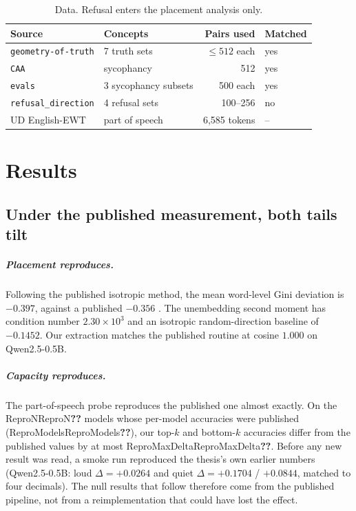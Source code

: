 \documentclass[11pt]{report}
\newcommand{\num}[1]{\ifcsname #1\endcsname\csname #1\endcsname\else\textbf{??}\fi}
\begin{document}
\begin{table}[h]\centering\small
\begin{tabular}{llrl}\toprule
Source & Concepts & Pairs used & Matched\\\midrule
\texttt{geometry-of-truth} \citep{marks2024geometry} & 7 truth sets & $\le 512$ each & yes\\
\texttt{CAA} \citep{panickssery2024steering} & sycophancy & 512 & yes\\
\texttt{evals} \citep{perez2022discovering} & 3 sycophancy subsets & 500 each & yes\\
\texttt{refusal\_direction} \citep{arditi2024refusal} & 4 refusal sets & 100--256 & no\\
UD English-EWT & part of speech & 6{,}585 tokens & --\\\bottomrule
\end{tabular}
\caption{Data. Refusal enters the placement analysis only.}
\end{table}

\chapter{Results}\label{ch:results}

\section{Under the published measurement, both tails tilt}\label{sec:tilt}
\paragraph{Placement reproduces.} Following the published isotropic method, the
mean word-level Gini deviation is $-0.397$, against a published $-0.356$
\citep{acharya2026concepts}. The unembedding second moment has condition number
$2.30\times10^{3}$ and an isotropic random-direction baseline of $-0.1452$. Our
extraction matches the published routine at cosine $1.000$ on Qwen2.5-0.5B.

\paragraph{Capacity reproduces.} The part-of-speech probe reproduces the
published one almost exactly. On the \num{ReproN}{} models whose per-model
accuracies were published (\num{ReproModels}), our top-$k$ and bottom-$k$
accuracies differ from the published values by at most \num{ReproMaxDelta}.
Before any new result was read, a smoke run reproduced the thesis's own earlier
numbers (Qwen2.5-0.5B: loud $\Delta = +0.0264$ and quiet
$\Delta = +0.1704$ / $+0.0844$, matched to four decimals). The null results that
follow therefore come from the published pipeline, not from a reimplementation
that could have lost the effect.
\end{document}
